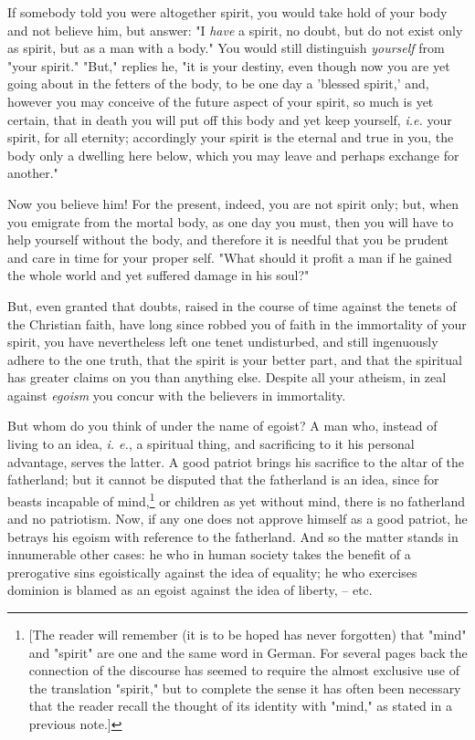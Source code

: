 If somebody told you were altogether spirit, you would take hold of your body 
and not believe him, but answer: "{}I \textit{have} a spirit, no doubt, but do 
not exist only as spirit, but as a man with a body."{} You would still 
distinguish \textit{yourself} from "{}your spirit."{} "{}But,"{} replies he, 
"{}it is your destiny, even though now you are yet going about in the fetters 
of the body, to be one day a 'blessed spirit,' and, however you may conceive 
of the future aspect of your spirit, so much is yet certain, that in death you 
will put off this body and yet keep yourself, \textit{i.e.} your spirit, for 
all eternity; accordingly your spirit is the eternal and true in you, the body 
only a dwelling here below, which you may leave and perhaps exchange for 
another."{}

Now you believe him! For the present, indeed, you are not spirit only; but, 
when you emigrate from the mortal body, as one day you must, then you will 
have to help yourself without the body, and therefore it is needful that you 
be prudent and care in time for your proper self. "{}What should it profit a 
man if he gained the whole world and yet suffered damage in his soul?"{}

But, even granted that doubts, raised in the course of time against the tenets 
of the Christian faith, have long since robbed you of faith in the immortality 
of your spirit, you have nevertheless left one tenet undisturbed, and still 
ingenuously adhere to the one truth, that the spirit is your better part, and 
that the spiritual has greater claims on you than anything else. Despite all 
your atheism, in zeal against \textit{egoism} you concur with the believers in 
immortality.

But whom do you think of under the name of egoist? A man who, instead of 
living to an idea, \textit{i. e.}, a spiritual thing, and sacrificing to it 
his personal advantage, serves the latter. A good patriot brings his sacrifice 
to the altar of the fatherland; but it cannot be disputed that the fatherland 
is an idea, since for beasts incapable of mind,\footnote{[The reader will 
remember (it is to be hoped has never forgotten) that "{}mind"{} and 
"{}spirit"{} are one and the same word in German. For several pages back the 
connection of the discourse has seemed to require the almost exclusive use of 
the translation "{}spirit,"{} but to complete the sense it has often been 
necessary that the reader recall the thought of its identity with "{}mind,"{} 
as stated in a previous note.]} or children as yet without mind, there is no 
fatherland and no patriotism. Now, if any one does not approve himself as a 
good patriot, he betrays his egoism with reference to the fatherland. And so 
the matter stands in innumerable other cases: he who in human society takes 
the benefit of a prerogative sins egoistically against the idea of equality; 
he who exercises dominion is blamed as an egoist against the idea of liberty, 
-- etc.

